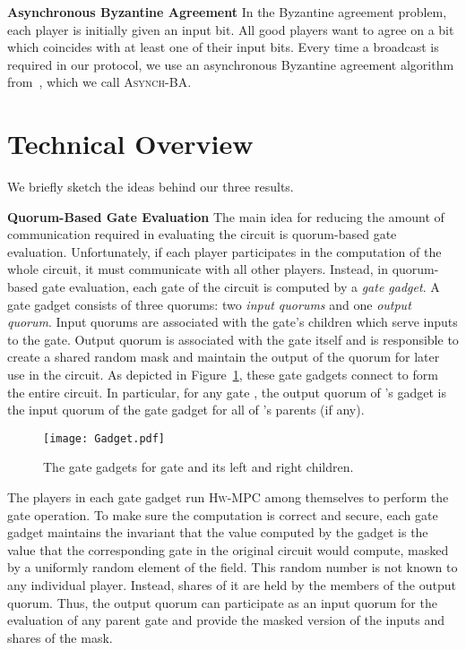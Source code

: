 \documentclass[10pt]{llncs}
\newcommand{\hw}{\textsc{Hw-MPC}\xspace}
\newcommand{\ba}{\textsc{Asynch-BA}\xspace}
\begin{document}
\smallskip
\noindent
{\bf Asynchronous Byzantine Agreement} In the Byzantine agreement
problem, each player is initially given an input bit. All good players
want to agree on a bit which coincides with at least one of their
input bits. Every time a broadcast is required in our protocol, we use
an asynchronous Byzantine agreement algorithm from~\cite{canetti}, which we
call \ba.



\section{Technical Overview}

We briefly sketch the ideas behind our three results.

\smallskip
\noindent
{\bf Quorum-Based Gate Evaluation} The main idea for reducing the
amount of communication required in evaluating the circuit is
quorum-based gate evaluation. Unfortunately, if each player
participates in the computation of the whole circuit, it must
communicate with all other players. Instead, in quorum-based gate
evaluation, each gate of the circuit is computed by a \emph{gate
  gadget}. A gate gadget consists of three quorums: two \emph{input
  quorums} and one \emph{output quorum}. Input quorums are associated
with the gate's children which serve inputs to the gate. Output quorum
is associated with the gate itself and is responsible to create a
shared random mask and maintain the output of the quorum for later use
in the circuit. As depicted in Figure~\ref{f:gadget}, these gate
gadgets connect to form the entire circuit. In particular, for any
gate , the output quorum of 's gadget is the input quorum of the
gate gadget for all of 's parents (if any).

\begin{figure}[t]
 \begin{center}
 \texttt{[image: Gadget.pdf]}
 \end{center}
 \caption{The gate gadgets for gate  and its left and right children.}
 \label{f:gadget}
 \end{figure}

The players in each gate gadget run \hw among themselves to perform
the gate operation. To make sure the computation is correct and
secure, each gate gadget maintains the invariant that the value
computed by the gadget is the value that the corresponding gate in the
original circuit would compute, masked by a uniformly random element
of the field. This random number is not known to any individual
player. Instead, shares of it are held by the members of the output
quorum.  Thus, the output quorum can participate as an input quorum
for the evaluation of any parent gate and provide the masked version
of the inputs and shares of the mask.
\end{document}
